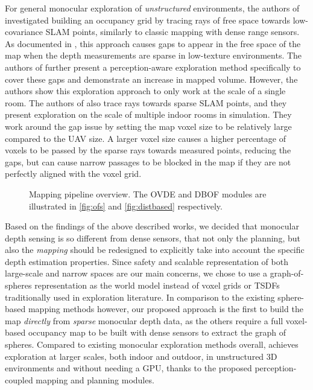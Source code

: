 \documentclass[letterpaper, 10 pt, journal, twoside]{IEEEtran}
\newcommand{\fix}[1]{\hypersetup{allcolors=black}{\color{black} {#1}}}
\begin{document}
{For general monocular exploration of \textit{unstructured} environments, the authors of \cite{from_monoslam_to_explo, los_maps} investigated building an occupancy grid \cite{occupancy_moravec} by tracing rays of free space towards low-covariance SLAM points, similarly to classic mapping with dense range sensors. 
As documented in \cite{from_monoslam_to_explo}, this approach causes gaps to appear in the free space of the map when the depth measurements are sparse in low-texture environments.
The authors of \cite{from_monoslam_to_explo} further present a perception-aware exploration method specifically to cover these gaps and demonstrate an increase in mapped volume.
However, the authors show this exploration approach to only work at the scale of a single room.
The authors of \cite{los_maps} also trace rays towards sparse SLAM points, and they present exploration on the scale of multiple indoor rooms in simulation.
They work around the gap issue by setting the map voxel size to be relatively large compared to the UAV size.
A larger voxel size causes a higher percentage of voxels to be passed by the sparse rays towards measured points, reducing the gaps, but can cause narrow passages to be blocked in the map if they are not perfectly aligned with the voxel grid.

\begin{figure}[!t]
\centering
{}
  \caption{
    {Mapping pipeline overview. The OVDE and DBOF modules are illustrated in \autoref{fig:ofs} and \autoref{fig:distbased} respectively.}
  }
  \label{fig:mapping_pipeline}
\end{figure}

Based on the findings of the above described works, we decided that monocular depth sensing is so different from dense sensors, that not only the planning, but also the \textit{mapping} should be redesigned to explicitly take into account the specific depth estimation properties.
Since safety and scalable representation of both large-scale and narrow spaces are our main concerns, we chose to use a graph-of-spheres representation \cite{spheregraph, spheremap, bubbleplanner} as the world model instead of voxel grids \cite{octomap, ufomap} or TSDFs \cite{voxblox} traditionally used in exploration literature.
In comparison to the existing sphere-based mapping methods however, our proposed approach is the first to build the map \textit{directly} from \textit{sparse} monocular depth data, as the others require a full voxel-based occupancy map to be built with dense sensors to extract the graph of spheres. 
Compared to existing monocular exploration methods overall, \fix{MonoSpheres} achieves exploration at larger scales, both indoor and outdoor, in unstructured 3D environments and without needing a GPU, thanks to the proposed perception-coupled mapping and planning modules.
}
\end{document}
